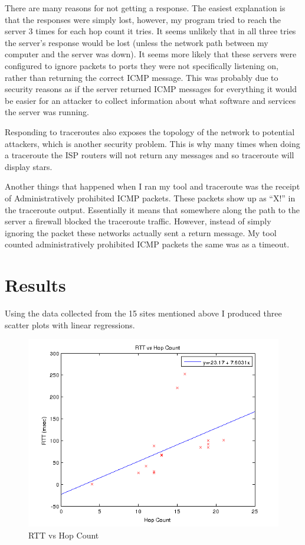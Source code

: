 \documentclass{article}
\begin{document}
There are many reasons for not getting a response. The easiest explanation is that the responses were simply lost, however, my program tried to reach the server 3 times for each hop count it tries. It seems unlikely that in all three tries the server's response would be lost (unless the network path between my computer and the server was down). It seems more likely that these servers were configured to ignore packets to ports they were not specifically listening on, rather than returning the correct ICMP message. This was probably due to security reasons as if the server returned ICMP messages for everything it would be easier for an attacker to collect information about what software and services the server was running.

Responding to traceroutes also exposes the topology of the network to potential attackers, which is another security problem. This is why many times when doing a traceroute the ISP routers will not return any messages and so traceroute will display stars.

Another things that happened when I ran my tool and traceroute was the receipt of Administratively prohibited ICMP packets. These packets show up as ``X!'' in the traceroute output. Essentially it means that somewhere along the path to the server a firewall blocked the traceroute traffic. However, instead of simply ignoring the packet these networks actually sent a return message. My tool counted administratively prohibited ICMP packets the same was as a timeout.

\section*{Results}

Using the data collected from the 15 sites mentioned above I produced three scatter plots with linear regressions.

\FloatBarrier
\begin{figure}[h!]
  \includegraphics{rtt_vs_hop_count1_legend.png}
  \caption{RTT vs Hop Count}
  \label{fig:scatter1}
\end{figure}
\FloatBarrier
\end{document}
